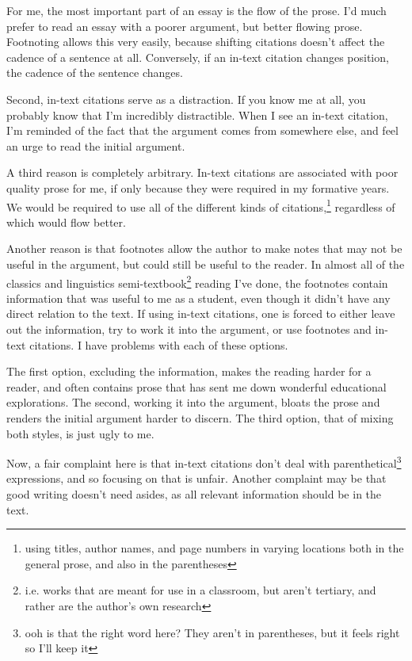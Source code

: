\documentclass[12pt]{article}[titlepage]
\newcommand{\1}{\={a}}
\newcommand{\2}{\={e}}
\newcommand{\3}{\={\i}}
\newcommand{\4}{\=o}
\newcommand{\5}{\=u}
\newcommand{\6}{\={A}}
\renewcommand{\,}{\textsuperscript{,}}
\begin{document}
For me, the most important part of an essay is the flow of the prose.
I'd much prefer to read an essay with a poorer argument, but better flowing prose.
Footnoting allows this very easily, because shifting citations doesn't affect the cadence of a sentence at all.
Conversely, if an in-text citation changes position, the cadence of the sentence changes.

Second, in-text citations serve as a distraction.
If you know me at all, you probably know that I'm incredibly distractible.
When I see an in-text citation, I'm reminded of the fact that the argument comes from somewhere else, and feel an urge to read the initial argument.

A third reason is completely arbitrary.
In-text citations are associated with poor quality prose for me, if only because they were required in my formative years.
We would be required to use all of the different kinds of citations,\footnote{using titles, author names, and page numbers in varying locations both in the general prose, and also in the parentheses} regardless of which would flow better.

Another reason is that footnotes allow the author to make notes that may not be useful in the argument, but could still be useful to the reader.
In almost all of the classics and linguistics semi-textbook\footnote{i.e. works that are meant for use in a classroom, but aren't tertiary, and rather are the author's own research} reading I've done, the footnotes contain information that was useful to me as a student, even though it didn't have any direct relation to the text.
If using in-text citations, one is forced to either leave out the information, try to work it into the argument, or use footnotes and in-text citations.
I have problems with each of these options.

The first option, excluding the information, makes the reading harder for a reader, and often contains prose that has sent me down wonderful educational explorations.
The second, working it into the argument, bloats the prose and renders the initial argument harder to discern.
The third option, that of mixing both styles, is just ugly to me.

Now, a fair complaint here is that in-text citations don't deal with parenthetical\footnote{ooh is that the right word here? They aren't in parentheses, but it feels right so I'll keep it} expressions, and so focusing on that is unfair.
Another complaint may be that good writing doesn't need asides, as all relevant information should be in the text.
\end{document}
